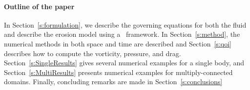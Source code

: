 \documentclass[preprint, 10pt]{elsarticle}
\begin{document}
\paragraph{Outline of the paper} In Section~\ref{s:formulation}, we
describe the governing equations for both the fluid and describe the
erosion model using a \thL~framework.  In Section~\ref{s:method}, the
numerical methods in both space and time are described and
Section~\ref{s:qoi} describes how to compute the vorticity, pressure,
and drag. Section~\ref{s:SingleResults} gives several numerical examples
for a single body, and Section~\ref{s:MultiResults} presents numerical
  examples for multiply-connected domains.  Finally, concluding remarks are made in Section~\ref{s:conclusions}




\end{document}
